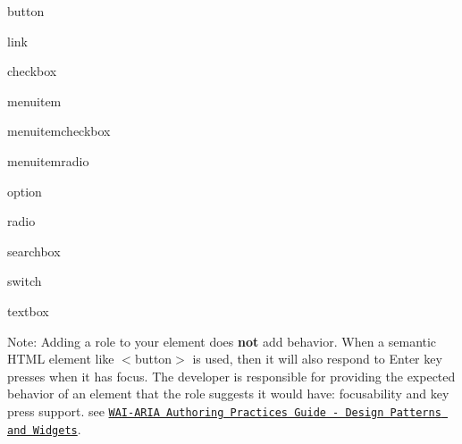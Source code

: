 \begin{DoxyEnumerate}
\item {\ttfamily button}
\end{DoxyEnumerate}
\begin{DoxyEnumerate}
\item {\ttfamily link}
\end{DoxyEnumerate}
\begin{DoxyEnumerate}
\item {\ttfamily checkbox}
\end{DoxyEnumerate}
\begin{DoxyEnumerate}
\item {\ttfamily menuitem}
\end{DoxyEnumerate}
\begin{DoxyEnumerate}
\item {\ttfamily menuitemcheckbox}
\end{DoxyEnumerate}
\begin{DoxyEnumerate}
\item {\ttfamily menuitemradio}
\end{DoxyEnumerate}
\begin{DoxyEnumerate}
\item {\ttfamily option}
\end{DoxyEnumerate}
\begin{DoxyEnumerate}
\item {\ttfamily radio}
\end{DoxyEnumerate}
\begin{DoxyEnumerate}
\item {\ttfamily searchbox}
\end{DoxyEnumerate}
\begin{DoxyEnumerate}
\item {\ttfamily switch}
\end{DoxyEnumerate}
\begin{DoxyEnumerate}
\item {\ttfamily textbox}
\end{DoxyEnumerate}

Note\+: Adding a role to your element does {\bfseries not} add behavior. When a semantic H\+T\+ML element like {\ttfamily $<$button$>$} is used, then it will also respond to Enter key presses when it has focus. The developer is responsible for providing the expected behavior of an element that the role suggests it would have\+: focusability and key press support. see \href{https://www.w3.org/TR/wai-aria-practices-1.1/#aria_ex}{\tt W\+A\+I-\/\+A\+R\+IA Authoring Practices Guide -\/ Design Patterns and Widgets}.

